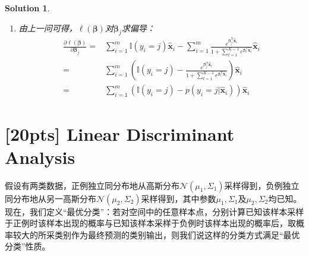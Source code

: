 \documentclass[a4paper,UTF8]{article}
\numberwithin{equation}{section}
\newtheorem*{solution}{Solution}
\begin{document}
\begin{solution}
\begin{enumerate}
\item
由上一问可得，$\ell(\boldsymbol{\beta})$对$\boldsymbol{\beta}_j$求偏导：
\begin{equation}
\begin{aligned}
\frac{\partial\ell(\boldsymbol{\beta})}{\partial\boldsymbol{\beta}_j} 
=& \sum_{i=1}^{m}\mathbb{I}(y_i=j)\hat{\mathbf{x}}_i - \sum_{i=1}^{m}\frac{e^{\boldsymbol{\beta}_j^\mathrm{T}\hat{\mathbf{x}}_i}}{1 + \sum_{t=1}^{K-1}e^{\boldsymbol{\beta}_t^\mathrm{T}\hat{\mathbf{x}}_i}}\hat{\mathbf{x}}_i\\
=& \sum_{i=1}^{m}(\mathbb{I}(y_i=j) - \frac{e^{\boldsymbol{\beta}_j^\mathrm{T}\hat{\mathbf{x}}_i}}{1 + \sum_{t=1}^{K-1}e^{\boldsymbol{\beta}_t^\mathrm{T}\hat{\mathbf{x}}_i}})\hat{\mathbf{x}}_i\\
=& \sum_{i=1}^{m}(\mathbb{I}(y_i=j) - 	p(y_i=j|\hat{\mathbf{x}}_i))\hat{\mathbf{x}}_i
\end{aligned}
\end{equation} 

\end{enumerate}	
	
\end{solution}
\newpage


\section{[20pts] Linear Discriminant Analysis}
假设有两类数据，正例独立同分布地从高斯分布$\mathcal{N}(\mu_1,\Sigma_1)$采样得到，负例独立同分布地从另一高斯分布$\mathcal{N}(\mu_2,\Sigma_2)$采样得到，其中参数$\mu_1,\Sigma_1$及$\mu_2,\Sigma_2$均已知。现在，我们定义“最优分类”：若对空间中的任意样本点，分别计算已知该样本采样于正例时该样本出现的概率与已知该样本采样于负例时该样本出现的概率后，取概率较大的所采类别作为最终预测的类别输出，则我们说这样的分类方式满足“最优分类”性质。
\end{document}
